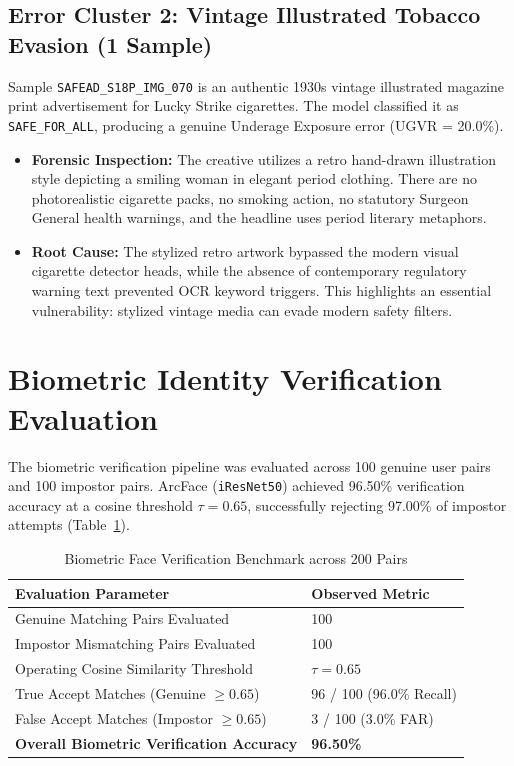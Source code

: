 \documentclass[12pt,a4paper]{report}
\begin{document}
\subsection{Error Cluster 2: Vintage Illustrated Tobacco Evasion (1 Sample)}
Sample \texttt{SAFEAD\_S18P\_IMG\_070} is an authentic 1930s vintage illustrated magazine print advertisement for Lucky Strike cigarettes. The model classified it as \texttt{SAFE\_FOR\_ALL}, producing a genuine Underage Exposure error (UGVR = 20.0\%).
\begin{itemize}
    \item \textbf{Forensic Inspection:} The creative utilizes a retro hand-drawn illustration style depicting a smiling woman in elegant period clothing. There are no photorealistic cigarette packs, no smoking action, no statutory Surgeon General health warnings, and the headline uses period literary metaphors.
    \item \textbf{Root Cause:} The stylized retro artwork bypassed the modern visual cigarette detector heads, while the absence of contemporary regulatory warning text prevented OCR keyword triggers. This highlights an essential vulnerability: stylized vintage media can evade modern safety filters.
\end{itemize}

\section{Biometric Identity Verification Evaluation}

The biometric verification pipeline was evaluated across 100 genuine user pairs and 100 impostor pairs. ArcFace (\texttt{iResNet50}) achieved 96.50\% verification accuracy at a cosine threshold $\tau = 0.65$, successfully rejecting 97.00\% of impostor attempts (Table~\ref{tab:face_verification_full}).

\begin{table}[htbp]
\centering
\small
\caption{Biometric Face Verification Benchmark across 200 Pairs}
\label{tab:face_verification_full}
\begin{tabular}{|p{6.5cm}|p{4.0cm}|}
\hline
\textbf{Evaluation Parameter} & \textbf{Observed Metric} \\
\hline
Genuine Matching Pairs Evaluated & 100 \\
Impostor Mismatching Pairs Evaluated & 100 \\
Operating Cosine Similarity Threshold & $\tau = 0.65$ \\
True Accept Matches (Genuine $\ge 0.65$) & 96 / 100 (96.0\% Recall) \\
False Accept Matches (Impostor $\ge 0.65$) & 3 / 100 (3.0\% FAR) \\
\textbf{Overall Biometric Verification Accuracy} & \textbf{96.50\%} \\
\hline
\end{tabular}
\end{table}
\end{document}
